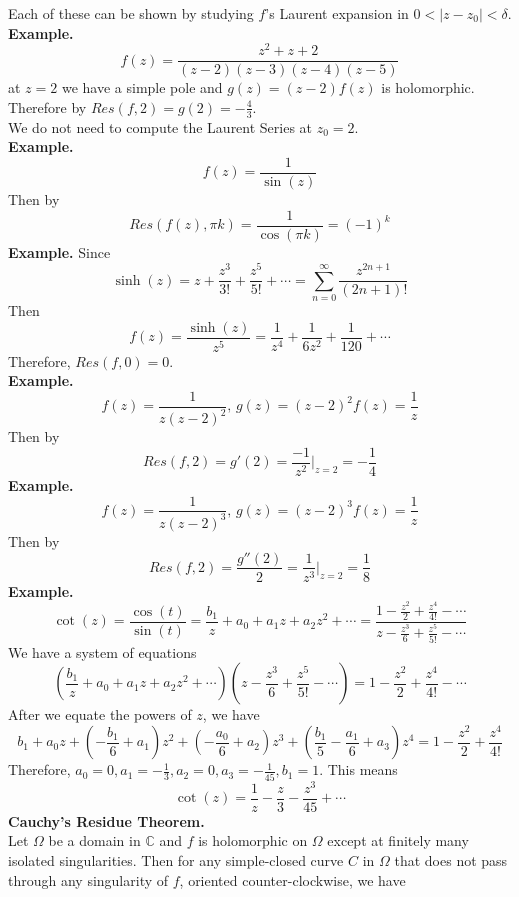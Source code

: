 \documentclass[11pt]{article}
\newcommand*\circled[1]{\tikz[baseline=(char.base)]{
            \node[shape=circle,draw,inner sep=2pt] (char) {#1};}}
\begin{document}
Each of these can be shown by studying $f$'s Laurent expansion in $ 0 < |z - z_0| < \delta$. \\
\newline
\textbf{Example.} 
$$f(z) = \frac{z^2 + z + 2}{(z - 2)(z - 3)(z - 4)(z - 5)}$$ 
at $z = 2$ we have a simple pole and $g(z) = (z - 2)f(z)$ is holomorphic. \\
Therefore by \circled{\scriptsize3} $Res(f, 2) = g(2) = -\frac{4}{3}$. \\
We do not need to compute the Laurent Series at $z_0 = 2$. \\
\newline
\textbf{Example.}
$$ f(z) = \frac{1}{\sin(z)}$$ 
Then by \circled{\scriptsize5} 
$$Res(f(z), \pi k) = \frac{1}{\cos(\pi k)} = (-1)^k $$
\newline
\textbf{Example.} Since 
$$\sinh(z) = z + \frac{z^3}{3!} + \frac{z^5}{5!} + \cdots = \sum_{n = 0}^{\infty}\frac{z^{2n + 1}}{(2n + 1)!}$$
Then 
$$ f(z) = \frac{\sinh(z)}{z^5} = \frac{1}{z^4} + \frac{1}{6z^2} + \frac{1}{120} + \cdots $$
Therefore, $Res(f, 0) = 0$. \\
\newline
\textbf{Example.}
$$ f(z) = \frac{1}{z(z - 2)^2}, \, g(z) = (z - 2)^2f(z) = \frac{1}{z}$$
Then by \circled{\scriptsize 6} 
$$ Res(f, 2) = g'(2) = \frac{-1}{z^2} \bigg\rvert_{z = 2} = -\frac{1}{4}$$ 
\newline
\textbf{Example.} 
$$ f(z) = \frac{1}{z(z - 2)^3}, \, g(z) = (z - 2)^3f(z) = \frac{1}{z}$$
Then by \circled{\scriptsize 6} 
$$ Res(f, 2) = \frac{g''(2)}{2} = \frac{1}{z^3} \bigg\rvert_{z = 2} = \frac{1}{8}$$ 
\newpage
\textbf{Example.} 
$$\cot(z) = \frac{\cos(t)}{\sin(t)} = \frac{b_1}{z} + a_0 + a_1z + a_2z^2 + \cdots = \frac{1 - \frac{z^2}{2} + \frac{z^4}{4!} - \cdots}{z - \frac{z^3}{6} + \frac{z^5}{5!} - \cdots}$$
We have a system of equations
$$(\frac{b_1}{z} + a_0 + a_1z + a_2z^2 + \cdots)(z - \frac{z^3}{6} + \frac{z^5}{5!} - \cdots) = 1 - \frac{z^2}{2} + \frac{z^4}{4!} - \cdots$$
After we equate the powers of $z$, we have
$$b_1 + a_0z + (-\frac{b_1}{6} + a_1)z^2 + (-\frac{a_0}{6} + a_2)z^3 + (\frac{b_1}{5} - \frac{a_1}{6} + a_3)z^4 = 1 - \frac{z^2}{2} + \frac{z^4}{4!}$$
Therefore, $a_0 = 0, a_1 = -\frac{1}{3}, a_2 = 0, a_3 = -\frac{1}{45}, b_1 = 1$. This means 
$$\cot(z) = \frac{1}{z} - \frac{z}{3} - \frac{z^3}{45} + \cdots $$
\newline
\textbf{Cauchy's Residue Theorem.} \\
Let $\Omega$ be a domain in $\mathbb{C}$ and $f$ is holomorphic on $\Omega$ except at finitely many isolated singularities. Then for any simple-closed curve $C$ in $\Omega$ that does not pass through any singularity of $f$, oriented counter-clockwise, we have
\end{document}
